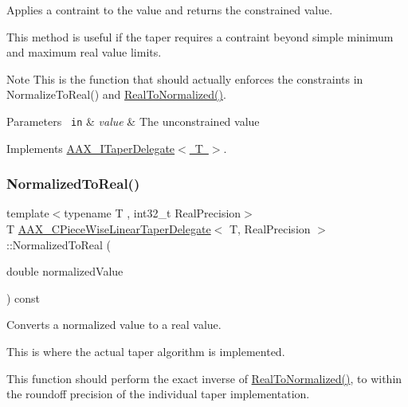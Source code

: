 Applies a contraint to the value and returns the constrained value. 

This method is useful if the taper requires a contraint beyond simple minimum and maximum real value limits.

\begin{DoxyNote}{Note}
This is the function that should actually enforces the constraints in Normalize\+To\+Real() and \mbox{\hyperlink{a01553_a5882df4a8f80ca2a88b512e87e7b36bc}{Real\+To\+Normalized()}}.
\end{DoxyNote}

\begin{DoxyParams}[1]{Parameters}
\mbox{\texttt{ in}}  & {\em value} & The unconstrained value \\
\hline
\end{DoxyParams}


Implements \mbox{\hyperlink{a01881_a1de7acdc2b3e114b6686bf845c2465f1}{A\+A\+X\+\_\+\+I\+Taper\+Delegate$<$ T $>$}}.

\mbox{\label{a01553_aa95b3b0312bb861f20aa91888ba051bf}} 
\subsubsection{\texorpdfstring{NormalizedToReal()}{NormalizedToReal()}}
{\footnotesize\ttfamily template$<$typename T , int32\+\_\+t Real\+Precision$>$ \\
T \mbox{\hyperlink{a01553}{A\+A\+X\+\_\+\+C\+Piece\+Wise\+Linear\+Taper\+Delegate}}$<$ T, Real\+Precision $>$\+::Normalized\+To\+Real (\begin{DoxyParamCaption}\item[{double}]{normalized\+Value }\end{DoxyParamCaption}) const\hspace{0.3cm}{\ttfamily [virtual]}}



Converts a normalized value to a real value. 

This is where the actual taper algorithm is implemented.

This function should perform the exact inverse of \mbox{\hyperlink{a01553_a5882df4a8f80ca2a88b512e87e7b36bc}{Real\+To\+Normalized()}}, to within the roundoff precision of the individual taper implementation.


